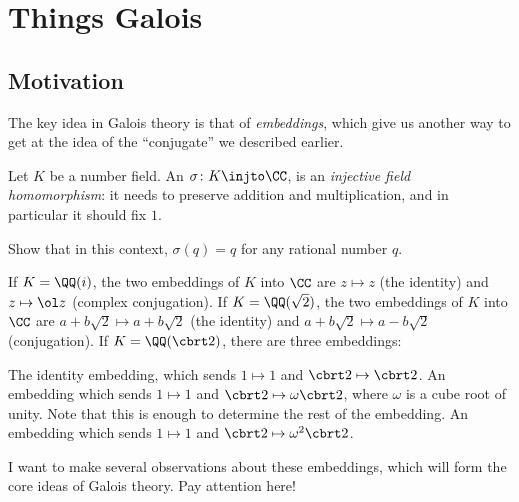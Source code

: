 \chapter{Things Galois}

\section{Motivation}
The key idea in Galois theory is that of \emph{embeddings},
which give us another way to get at the idea of the ``conjugate'' we described earlier.

Let $K$ be a number field.
An  $\sigma \colon K \injto \CC$,
is an \emph{injective field homomorphism}:
it needs to preserve addition and multiplication,
and in particular it should fix $1$.
\begin{ques}
	Show that in this context, $\sigma(q) = q$ for any rational number $q$.
\end{ques}

\begin{example}
	\listhack
	\begin{enumerate}[(a)]
		\ii If $K = \QQ(i)$, the two embeddings of $K$ into $\CC$ are
		$z \mapsto z$ (the identity) and $z \mapsto \ol z$ (complex conjugation).
		\ii If $K = \QQ(\sqrt 2)$, the two embeddings of $K$ into $\CC$ are
		$a+b\sqrt 2 \mapsto a+b\sqrt 2$ (the identity) and $a+b\sqrt 2 \mapsto a-b\sqrt 2$ (conjugation).
		\ii If $K = \QQ(\cbrt 2)$, there are three embeddings:
		\begin{itemize}
			\ii The identity embedding, which sends $1 \mapsto 1$ and $\cbrt 2 \mapsto \cbrt 2$.
			\ii An embedding which sends $1 \mapsto 1$ and $\cbrt 2 \mapsto \omega \cbrt 2$,
			where $\omega$ is a cube root of unity.
			Note that this is enough to determine the rest of the embedding.
			\ii An embedding which sends $1 \mapsto 1$ and $\cbrt 2 \mapsto \omega^2 \cbrt 2$.
		\end{itemize}
	\end{enumerate}
\end{example}

I want to make several observations about these embeddings,
which will form the core ideas of Galois theory.
Pay attention here!

